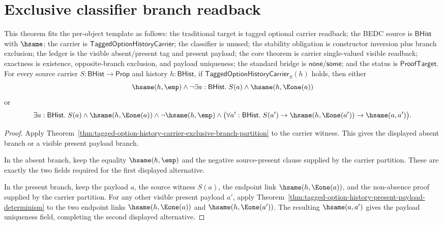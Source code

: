 \section{Exclusive classifier branch readback}
\label{sec:option-classifier-exclusive-branch-readback}

\begin{theorem}
\label{thm:tagged-option-history-carrier-single-valued-visible-readback}
This theorem fits the per-object template as follows: the traditional target is
tagged optional carrier readback; the BEDC source is $\mathsf{BHist}$ with
$\hsame$; the carrier is $\mathsf{TaggedOptionHistoryCarrier}$; the classifier
is unused; the stability obligation is constructor inversion plus branch
exclusion; the ledger is the visible absent/present tag and present payload; the
core theorem is carrier single-valued visible readback; exactness is existence,
opposite-branch exclusion, and payload uniqueness; the standard bridge is
$\mathsf{none}$/$\mathsf{some}$; and the status is $\mathsf{ProofTarget}$. For
every source carrier $S:\mathsf{BHist}\to\mathsf{Prop}$ and history
$h:\mathsf{BHist}$, if $\mathsf{TaggedOptionHistoryCarrier}_S(h)$ holds, then
either
$$
\hsame(h,\emp)\land
\neg\exists a:\mathsf{BHist}.\; S(a)\land\hsame(h,\Eone(a))
$$
or
$$
\exists a:\mathsf{BHist}.\;
S(a)\land
\hsame(h,\Eone(a))\land
\neg\hsame(h,\emp)\land
\bigl(\forall a':\mathsf{BHist}.\;
S(a')\to \hsame(h,\Eone(a'))\to \hsame(a,a')\bigr).
$$
\end{theorem}
\begin{proof}
Apply Theorem~\ref{thm:tagged-option-history-carrier-exclusive-branch-partition}
to the carrier witness. This gives the displayed absent branch or a visible
present payload branch.

In the absent branch, keep the equality $\hsame(h,\emp)$ and the negative
source-present clause supplied by the carrier partition. These are exactly the
two fields required for the first displayed alternative.

In the present branch, keep the payload $a$, the source witness $S(a)$, the
endpoint link $\hsame(h,\Eone(a))$, and the non-absence proof supplied by the
carrier partition. For any other visible present payload $a'$, apply
Theorem~\ref{thm:tagged-option-history-present-payload-determinism} to the two
endpoint links $\hsame(h,\Eone(a))$ and $\hsame(h,\Eone(a'))$. The resulting
$\hsame(a,a')$ gives the payload uniqueness field, completing the second
displayed alternative.
\end{proof}

